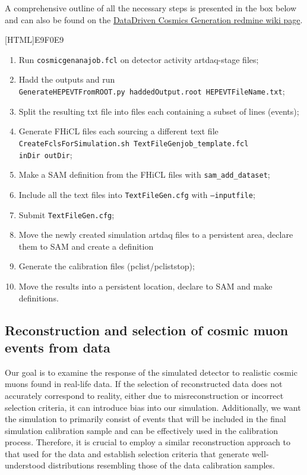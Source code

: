 \documentclass[12pt]{article}
\begin{document}
A comprehensive outline of all the necessary steps is presented in the box below and can also be found on the \href{https://cdcvs.fnal.gov/redmine/projects/novaart/wiki/DataDriven\_Cosmics}{DataDriven Cosmics Generation redmine wiki page}.

\vspace{5mm}
[HTML]{E9F0E9}{
\parbox{.9\textwidth}{
\begin{enumerate}
\item Run \texttt{cosmicgenanajob.fcl} on detector activity artdaq-stage files;
\item Hadd the outputs and run\\\texttt{GenerateHEPEVTFromROOT.py haddedOutput.root HEPEVTFileName.txt};
\item Split the resulting txt file into files each containing a subset of lines (events);
\item Generate FHiCL files each sourcing a different text file \\\texttt{CreateFclsForSimulation.sh TextFileGenjob\_template.fcl}\\ \hspace*{58mm}\texttt{inDir outDir};
\item Make a SAM definition from the FHiCL files with \texttt{sam\_add\_dataset};
\item Include all the text files into \texttt{TextFileGen.cfg} with \texttt{--inputfile};
\item Submit \texttt{TextFileGen.cfg};
\item Move the newly created simulation artdaq files to a persistent area, declare them to SAM and create a definition 
\item Generate the calibration files (pclist/pcliststop);
\item Move the results into a persistent location, declare to SAM and make definitions.
\end{enumerate}
}}

\subsection{Reconstruction and selection of cosmic muon events from data}\label{secCosmicGenAna}

Our goal is to examine the response of the simulated detector to realistic cosmic muons found in real-life data. If the selection of reconstructed data does not accurately correspond to reality, either due to misreconstruction or incorrect selection criteria, it can introduce bias into our simulation. Additionally, we want the simulation to primarily consist of events that will be included in the final simulation calibration sample and can be effectively used in the calibration process. Therefore, it is crucial to employ a similar reconstruction approach to that used for the data and establish selection criteria that generate well-understood distributions resembling those of the data calibration samples.
\end{document}
